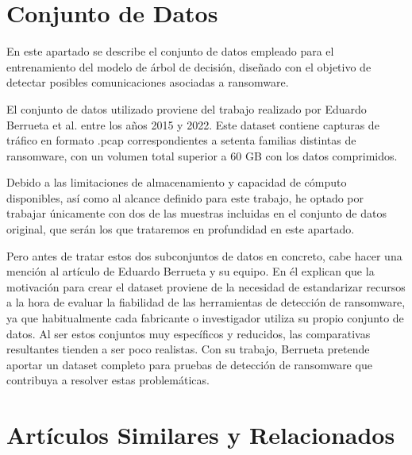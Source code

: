 \section{Conjunto de Datos}
En este apartado se describe el conjunto de datos empleado para el entrenamiento del modelo de árbol de decisión, diseñado con el objetivo de detectar posibles comunicaciones asociadas a ransomware.

El conjunto de datos utilizado proviene del trabajo realizado por Eduardo Berrueta et al. entre los años 2015 y 2022\cite{qnyn-q136-20}. Este dataset contiene capturas de tráfico en formato .pcap correspondientes a setenta familias distintas de ransomware, con un volumen total superior a 60 GB con los datos comprimidos.

Debido a las limitaciones de almacenamiento y capacidad de cómputo disponibles, así como al alcance definido para este trabajo, he optado por trabajar únicamente con dos de las muestras incluidas en el conjunto de datos original, que serán los que trataremos en profundidad en este apartado.

Pero antes de tratar estos dos subconjuntos de datos en concreto, cabe hacer una mención al artículo de Eduardo Berrueta y su equipo\cite{9050526}. En él explican que la motivación para crear el dataset proviene de la necesidad de estandarizar recursos a la hora de evaluar la fiabilidad de las herramientas de detección de ransomware, ya que habitualmente cada fabricante o investigador utiliza su propio conjunto de datos. Al ser estos conjuntos muy específicos y reducidos, las comparativas resultantes tienden a ser poco realistas. Con su trabajo, Berrueta pretende aportar un dataset completo para pruebas de detección de ransomware que contribuya a resolver estas problemáticas.


\section{Artículos Similares y Relacionados}
